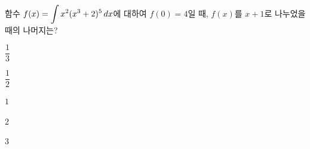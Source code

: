 함수 $f(x)=\displaystyle\int x^2(x^3+2)^5\mkern3mu dx$에 대하여 $f(0)=4$일 때, $f(x)$를 $x+1$로 나누었을 때의 나머지는?
\begin{choices32}{\rule[-3ex]{0pt}{8ex}$\dfrac{1}{3}$}{\rule[-3ex]{0pt}{8ex}$\dfrac{1}{2}$}{\rule[-3ex]{0pt}{8ex}$1$}{\rule[-3ex]{0pt}{8ex}$2$}{\rule[-3ex]{0pt}{8ex}$3$}\end{choices32}
